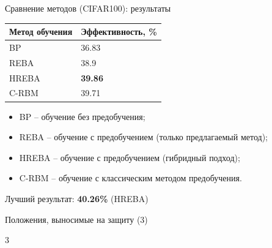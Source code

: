\documentclass[10pt]{beamer}
\begin{document}
        \begin{frame}{Сравнение методов (CIFAR100): результаты}
            \begin{table} [!h]
              \small
            \centering
            \begin{tabular}{| p{3cm} | p{3cm} |}
              \hline
                \textbf{Метод обучения} & \textbf{Эффективность, \%}\\
                \hline
                BP & 36.83\\
                \hline
                REBA & 38.9\\
                \hline
                HREBA & \textbf{39.86}\\
                \hline
                C-RBM & 39.71\\
                \hline
            \end{tabular}
            \end{table}
            \begin{itemize}
                \item BP -- обучение без предобучения; 
                \item REBA -- обучение с предобучением (только предлагаемый метод);
                \item HREBA -- обучение с предобучением (гибридный подход);
                \item C-RBM -- обучение с классическим методом предобучения.
            \end{itemize}
            Лучший результат: \textbf{40.26\%} (HREBA)\\
        \end{frame}

        \begin{frame}{Положения, выносимые на защиту (3)}
            \begin{block}{3}
                \large
            \end{block}
        \end{frame}
\end{document}

